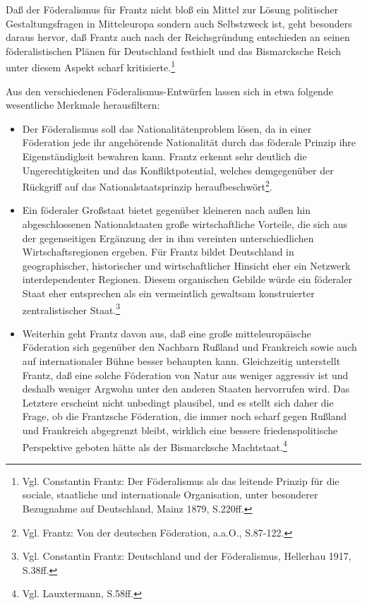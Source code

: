 \documentclass[a4paper,12pt]{article}
\begin{document}
Daß der Föderalismus für Frantz nicht bloß ein Mittel zur Lösung
politischer Gestaltungsfragen in Mitteleuropa sondern auch
Selbstzweck ist, geht besonders daraus hervor, daß Frantz auch nach der
Reichsgründung entschieden an seinen föderalistischen Plänen für
Deutschland festhielt und das Bismarcksche Reich unter diesem
Aspekt scharf kritisierte.\footnote{Vgl. Constantin
Frantz\cite{frantz-foederalismus}: Der Föderalismus als das
leitende Prinzip für die sociale, staatliche und internationale
Organisation, unter besonderer Bezugnahme auf Deutschland, Mainz
1879, S.220ff.}

Aus den verschiedenen Föderalismus-Entwürfen lassen sich in etwa
folgende wesentliche Merkmale herausfiltern:
\begin{itemize}

\item Der Föderalismus soll das Nationalitätenproblem lösen, da in
einer Föderation jede ihr angehörende Nationalität durch das
föderale Prinzip ihre Eigenständigkeit bewahren kann. Frantz
erkennt sehr deutlich die Ungerechtigkeiten und das
Konfliktpotential, welches demgegenüber der Rückgriff auf das
Nationalstaatsprinzip
heraufbeschwört\footnote{Vgl. Frantz\cite{frantz-foederation}: Von
der deutschen Föderation, a.a.O., S.87-122.}.

\item Ein föderaler Großstaat bietet gegenüber kleineren nach außen
hin abgeschlossenen Nationalstaaten große wirtschaftliche Vorteile,
die sich aus der gegenseitigen Ergänzung der in ihm vereinten
unterschiedlichen Wirtschaftsregionen ergeben. Für Frantz bildet
Deutschland in geographischer, historischer und wirtschaftlicher
Hinsicht eher ein Netzwerk interdependenter Regionen. Diesem
organischen Gebilde würde ein föderaler Staat eher entsprechen als ein
vermeintlich gewaltsam konstruierter zentralistischer
Staat.\footnote{Vgl. Constantin Frantz\cite{frantz-deutschland}:
Deutschland und der Föderalismus, Hellerhau 1917, S.38ff.}

\item Weiterhin geht Frantz davon aus, daß eine große
mitteleuropäische Föderation sich gegenüber den Nachbarn Rußland und
Frankreich sowie auch auf internationaler Bühne besser behaupten
kann. Gleichzeitig unterstellt Frantz, daß eine solche Föderation von
Natur aus weniger aggressiv ist und deshalb weniger Argwohn unter den
anderen Staaten hervorrufen wird. Das Letztere erscheint nicht
unbedingt plausibel, und es stellt sich daher die Frage, ob die
Frantzsche Föderation, die immer noch scharf gegen Rußland und
Frankreich abgegrenzt bleibt, wirklich eine bessere friedenspolitische
Perspektive geboten hätte als der Bismarcksche
Machtstaat.\footnote{Vgl. Lauxtermann\cite{lauxtermann}, S.58ff.}


\end{itemize}
\end{document}
